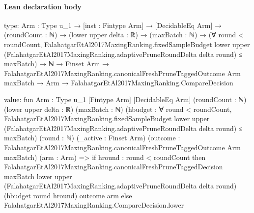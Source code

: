 \documentclass[10pt]{article}
\begin{document}
\paragraph{Lean declaration body}
\begin{ReviewVerbatim}
type:
{Arm : Type u_1} →
  [inst : Fintype Arm] →
    [DecidableEq Arm] →
      (roundCount : ℕ) →
        (lower upper delta : ℝ) →
          (maxBatch : ℕ) →
            (∀ round < roundCount,
                FalahatgarEtAl2017MaxingRanking.fixedSampleBudget lower upper
                    (FalahatgarEtAl2017MaxingRanking.adaptivePruneRoundDelta delta round) ≤
                  maxBatch) →
              ℕ →
                Finset Arm →
                  FalahatgarEtAl2017MaxingRanking.canonicalFreshPruneTaggedOutcome Arm maxBatch →
                    Arm → FalahatgarEtAl2017MaxingRanking.CompareDecision

value:
fun {Arm : Type u_1} [Fintype Arm] [DecidableEq Arm] (roundCount : ℕ) (lower upper delta : ℝ) (maxBatch : ℕ)
    (hbudget :
      ∀ round < roundCount,
        FalahatgarEtAl2017MaxingRanking.fixedSampleBudget lower upper
            (FalahatgarEtAl2017MaxingRanking.adaptivePruneRoundDelta delta round) ≤
          maxBatch)
    (round : ℕ) (_active : Finset Arm)
    (outcome : FalahatgarEtAl2017MaxingRanking.canonicalFreshPruneTaggedOutcome Arm maxBatch) (arm : Arm) =>
  if hround : round < roundCount then
    FalahatgarEtAl2017MaxingRanking.canonicalFreshPruneTaggedDecision maxBatch lower upper
      (FalahatgarEtAl2017MaxingRanking.adaptivePruneRoundDelta delta round) (hbudget round hround) outcome arm
  else FalahatgarEtAl2017MaxingRanking.CompareDecision.lower
\end{ReviewVerbatim}
\end{document}
